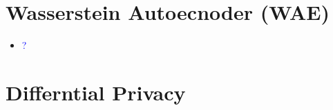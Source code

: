 \documentclass{article}
\newcommand{\blue}[1]{\textcolor{blue}{#1}}
\begin{document}

\section{Wasserstein Autoecnoder (WAE)}

\begin{itemize}
    \item \blue{?}
\end{itemize}




\section{Differntial Privacy}
\end{document}
